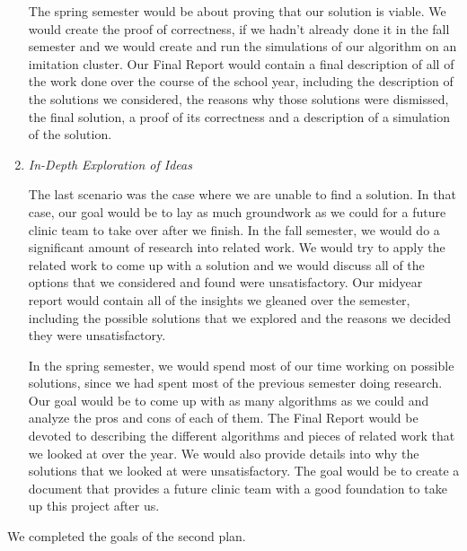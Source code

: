 \begin{enumerate}
  The spring semester would be about proving that our solution is
  viable. We would create the proof of correctness, if we hadn't
  already done it in the fall semester and we would create and run the
  simulations of our algorithm on an imitation cluster. Our Final
  Report would contain a final description of all of the work done
  over the course of the school year, including the description of the
  solutions we considered, the reasons why those solutions were
  dismissed, the final solution, a proof of its correctness and a
  description of a simulation of the solution.


\item \emph{In-Depth Exploration of Ideas}

  The last scenario was the case where we are unable to find a
  solution. In that case, our goal would be to lay as much groundwork
  as we could for a future clinic team to take over after we
  finish. In the fall semester, we would do a significant amount of
  research into related work. We would try to apply the related work
  to come up with a solution and we would discuss all of the options
  that we considered and found were unsatisfactory. Our midyear report
  would contain all of the insights we gleaned over the semester,
  including the possible solutions that we explored and the reasons we
  decided they were unsatisfactory.

  In the spring semester, we would spend most of our time working on
  possible solutions, since we had spent most of the previous semester
  doing research. Our goal would be to come up with as many algorithms
  as we could and analyze the pros and cons of each of them. The Final
  Report would be devoted to describing the different algorithms and
  pieces of related work that we looked at over the year. We would
  also provide details into why the solutions that we looked at were
  unsatisfactory. The goal would be to create a document that provides
  a future clinic team with a good foundation to take up this project
  after us.

\end{enumerate}

We completed the goals of the second plan. 
